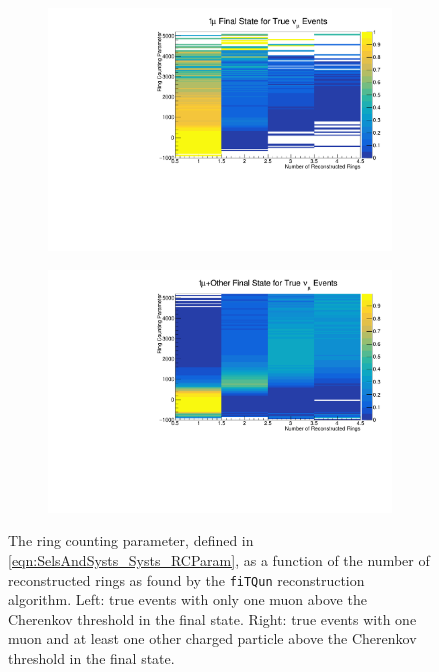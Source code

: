 \begin{figure}[h]
  \begin{subfigure}[t]{0.49\textwidth}
    \includegraphics[width=\textwidth, trim={0mm 0mm 0mm 0mm}, clip,page=1]{Figures/Selections/NuFlavour_14_Top_1.pdf}
  \end{subfigure}%
  \begin{subfigure}[t]{0.49\textwidth}
    \includegraphics[width=\textwidth, trim={0mm 0mm 0mm 0mm}, clip,page=1]{Figures/Selections/NuFlavour_14_Top_3.pdf}
  \end{subfigure}
  \caption{The ring counting parameter, defined in \autoref{eqn:SelsAndSysts_Systs_RCParam}, as a function of the number of reconstructed rings as found by the \texttt{fiTQun} reconstruction algorithm. Left: true \quickmath{\nu_{\mu}} events with only one muon above the Cherenkov threshold in the final state. Right: true \quickmath{\nu_{\mu}} events with one muon and at least one other charged particle above the Cherenkov threshold in the final state.}
  \label{fig:SelsAndSysts_RCMaps}
\end{figure}

